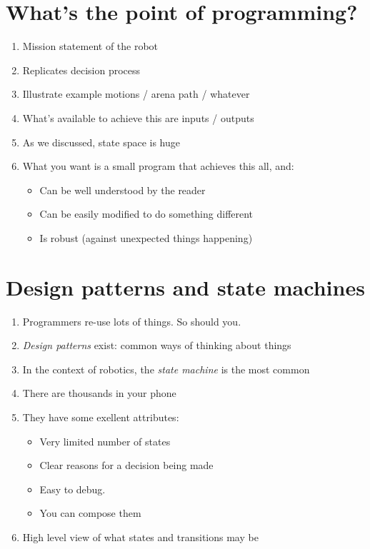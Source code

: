\documentclass[a4paper,10pt]{article}
\begin{document}
\section{What's the point of programming?}
\begin{enumerate}
\item Mission statement of the robot
\item Replicates decision process
\item Illustrate example motions / arena path / whatever
\item What's available to achieve this are inputs / outputs
\item As we discussed, state space is huge
\item What you want is a small program that achieves this all, and:
\begin{itemize}
	\item Can be well understood by the reader
	\item Can be easily modified to do something different
	\item Is robust (against unexpected things happening)
\end{itemize}
\end{enumerate}

\section{Design patterns and state machines}
\begin{enumerate}
\item Programmers re-use lots of things. So should you.
\item \textit{Design patterns} exist: common ways of thinking about things
\item In the context of robotics, the \textit{state machine} is the most common
\item There are thousands in your phone
\item They have some exellent attributes:
\begin{itemize}
	\item Very limited number of states
	\item Clear reasons for a decision being made
	\item Easy to debug.
	\item You can compose them
\end{itemize}
\item High level view of what states and transitions may be
\end{enumerate}
\end{document}
